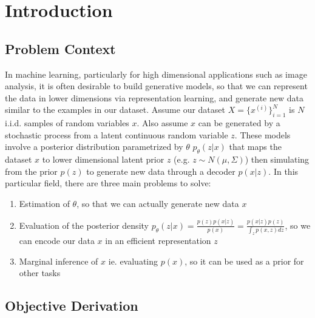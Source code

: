 \documentclass[a4paper,12pt]{article}
\numberwithin{equation}{section}
\begin{document}
\tableofcontents
\newpage
\section{Introduction}
\subsection{Problem Context}
In machine learning, particularly for high dimensional applications such as image analysis, it is often desirable to build generative models, so that we can represent the data in lower dimensions via representation learning, and generate new data similar to the examples in our dataset. Assume our dataset $X=\{x^{(i)}\}^N_{i=1}$ is $N$ i.i.d. samples of random variables $x$. Also assume $x$ can be generated by a stochastic process from a latent continuous random variable $z$. These models involve a posterior distribution parametrized by $\theta$ $p_\theta(z|x)$ that maps the dataset $x$ to lower dimensional latent prior $z$ (e.g. $z\sim N(\mu,\Sigma)$) then simulating from the prior $p(z)$ to generate new data through a decoder $p(x|z)$. In this particular field, there are three main problems to solve:
\begin{enumerate}
\item Estimation of $\theta$, so that we can actually generate new data $x$
\item Evaluation of the posterior density $p_\theta(z|x) = \frac{p(z)p(x|z)}{p(x)} = \frac{p(x|z)p(z)}{\int_z p(x,z)dz}$, so we can encode our data $x$ in an efficient representation $z$
\item Marginal inference of $x$ ie. evaluating $p(x)$, so it can be used as a prior for other tasks
\end{enumerate}
\newpage
\subsection{Objective Derivation}
\end{document}
